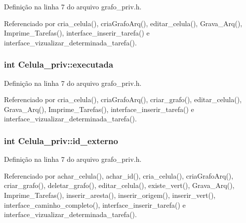 Definição na linha 7 do arquivo grafo\+\_\+priv.\+h.



Referenciado por cria\+\_\+celula(), cria\+Grafo\+Arq(), editar\+\_\+celula(), Grava\+\_\+\+Arq(), Imprime\+\_\+\+Tarefas(), interface\+\_\+inserir\+\_\+tarefa() e interface\+\_\+vizualizar\+\_\+determinada\+\_\+tarefa().

\hypertarget{structCelula__priv_af5f995caad41372e844f965021c5d183}{}
\subsubsection[{executada}]{\setlength{\rightskip}{0pt plus 5cm}int Celula\+\_\+priv\+::executada}\label{structCelula__priv_af5f995caad41372e844f965021c5d183}


Definição na linha 7 do arquivo grafo\+\_\+priv.\+h.



Referenciado por cria\+\_\+celula(), cria\+Grafo\+Arq(), criar\+\_\+grafo(), editar\+\_\+celula(), Grava\+\_\+\+Arq(), Imprime\+\_\+\+Tarefas(), interface\+\_\+inserir\+\_\+tarefa() e interface\+\_\+vizualizar\+\_\+determinada\+\_\+tarefa().

\hypertarget{structCelula__priv_a78a8525da28e1918d0faaf127001bd7b}{}
\subsubsection[{id\+\_\+externo}]{\setlength{\rightskip}{0pt plus 5cm}int Celula\+\_\+priv\+::id\+\_\+externo}\label{structCelula__priv_a78a8525da28e1918d0faaf127001bd7b}


Definição na linha 7 do arquivo grafo\+\_\+priv.\+h.



Referenciado por achar\+\_\+celula(), achar\+\_\+id(), cria\+\_\+celula(), cria\+Grafo\+Arq(), criar\+\_\+grafo(), deletar\+\_\+grafo(), editar\+\_\+celula(), existe\+\_\+vert(), Grava\+\_\+\+Arq(), Imprime\+\_\+\+Tarefas(), inserir\+\_\+aresta(), inserir\+\_\+origem(), inserir\+\_\+vert(), interface\+\_\+caminho\+\_\+completo(), interface\+\_\+inserir\+\_\+tarefa() e interface\+\_\+vizualizar\+\_\+determinada\+\_\+tarefa().

\hypertarget{structCelula__priv_a3c49601fe078bd7bb1512f0107af5301}{}
